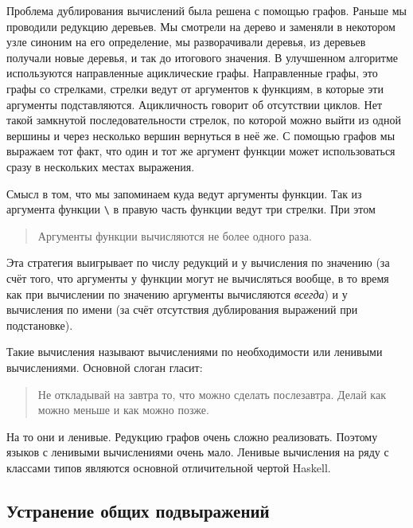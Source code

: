Проблема дублирования вычислений была решена с помощью графов.
Раньше мы проводили редукцию деревьев. Мы смотрели на дерево и
заменяли в некотором узле синоним на его определение, мы
разворачивали деревья, из деревьев получали новые деревья,
и так до итогового значения. В улучшенном алгоритме используются
направленные ациклические графы. Направленные графы, это
графы со стрелками, стрелки ведут от аргументов к функциям,
в которые эти аргументы подставляются. Ацикличность говорит об 
отсутствии циклов. Нет такой замкнутой последовательности стрелок,
по которой можно выйти из одной вершины и через несколько
вершин вернуться в неё же. С помощью графов мы выражаем
тот факт, что один и тот же аргумент функции может использоваться
сразу в нескольких местах выражения. 

Смысл в том, что мы запоминаем куда ведут аргументы
функции. Так из аргумента функции 
\verb!\! в правую часть
функции ведут три стрелки. При этом

\begin{quote}

Аргументы функции вычисляются не более одного раза.

\end{quote}

Эта стратегия выигрывает по числу редукций и у вычисления
по значению (за счёт того, что аргументы у функции могут
не вычисляться вообще, в то время как при вычислении по
значению аргументы вычисляются \emph{всегда}) и у вычисления 
по имени (за счёт отсутствия дублирования выражений при подстановке).

Такие вычисления называют вычислениями по необходимости
или ленивыми вычислениями. Основной слоган гласит:

\begin{quote}

Не откладывай на завтра то, что можно сделать послезавтра.
Делай как можно меньше и как можно позже.

\end{quote}

На то они и ленивые. Редукцию графов очень сложно реализовать.
Поэтому языков с ленивыми вычислениями очень мало. Ленивые вычисления
на ряду с классами типов являются основной отличительной чертой Haskell. 

\subsection{Устранение общих подвыражений}

